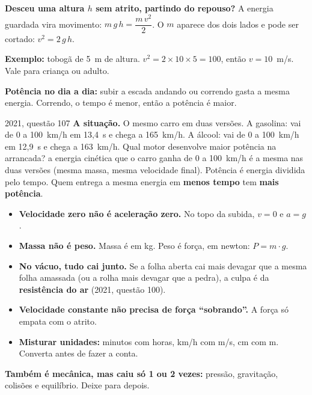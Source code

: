 {\small \textbf{Desceu uma altura $h$ sem atrito, partindo do repouso?} A energia guardada vira movimento: $m\,g\,h = \dfrac{m\,v^2}{2}$.
O $m$ aparece dos dois lados e pode ser cortado: $v^2 = 2\,g\,h$.\par
\textbf{Exemplo:} tobogã de 5~m de altura. $v^2 = 2 \times 10 \times 5 = 100$, então $v = 10$~m/s. Vale para criança ou adulto.\par
\textbf{Potência no dia a dia:} subir a escada andando ou correndo gasta a mesma energia. Correndo, o tempo é menor, então a potência é maior.}

\begin{enemreal}{2021, questão 107}
\textbf{A situação.} O mesmo carro em duas versões. A gasolina: vai de 0 a 100~km/h em 13,4~s e chega a 165~km/h. A álcool:
vai de 0 a 100~km/h em 12,9~s e chega a 163~km/h. Qual motor desenvolve maior potência na arrancada?
 a energia cinética que o carro ganha de 0 a 100~km/h é a mesma nas duas versões (mesma massa, mesma velocidade final).
Potência é energia dividida pelo tempo. Quem entrega a mesma energia em \textbf{menos tempo} tem \textbf{mais potência}.
\end{enemreal}

\begin{pegadinha}
\begin{itemize}
  \item \textbf{Velocidade zero não é aceleração zero.} No topo da subida, $v = 0$ e $a = g$.
  \item \textbf{Massa não é peso.} Massa é em kg. Peso é força, em newton: $P = m \cdot g$.
  \item \textbf{No vácuo, tudo cai junto.} Se a folha aberta cai mais devagar que a mesma folha amassada (ou a rolha mais devagar que a pedra),
    a culpa é da \textbf{resistência do ar} (2021, questão 100).
  \item \textbf{Velocidade constante não precisa de força ``sobrando''.} A força só empata com o atrito.
  \item \textbf{Misturar unidades:} minutos com horas, km/h com m/s, cm com m. Converta antes de fazer a conta.
\end{itemize}
\end{pegadinha}

{\small\textbf{Também é mecânica, mas caiu só 1 ou 2 vezes:} pressão, gravitação, colisões e equilíbrio. Deixe para depois.}
